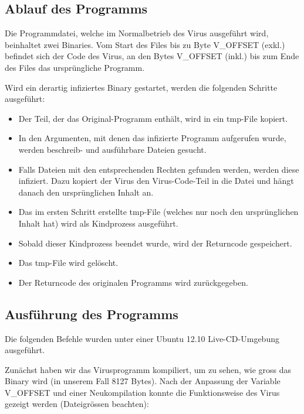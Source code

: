 \documentclass[a4paper,11pt,parskip=half]{scrartcl}
\begin{document}
\subsection{Ablauf des Programms}
Die Programmdatei, welche im \glqq{}Normalbetrieb\grqq{} des Virus ausgeführt wird, beinhaltet zwei Binaries. Vom Start des Files bis zu Byte V\_OFFSET (exkl.) befindet sich der Code des Virus, an den Bytes V\_OFFSET (inkl.) bis zum Ende des Files das ursprüngliche Programm.

Wird ein derartig infiziertes Binary gestartet, werden die folgenden Schritte ausgeführt:
\begin{itemize}
	\item Der Teil, der das Original-Programm enthält, wird in ein tmp-File kopiert.
	\item In den Argumenten, mit denen das infizierte Programm aufgerufen wurde, werden beschreib- und ausführbare Dateien gesucht.
	\item Falls Dateien mit den entsprechenden Rechten gefunden werden, werden diese infiziert. Dazu kopiert der Virus den Virus-Code-Teil in die Datei und hängt danach den ursprünglichen Inhalt an.
	\item Das im ersten Schritt erstellte tmp-File (welches nur noch den ursprünglichen Inhalt hat) wird als Kindprozess ausgeführt.
	\item Sobald dieser Kindprozess beendet wurde, wird der Returncode gespeichert.
	\item Das tmp-File wird gelöscht.
	\item Der Returncode des originalen Programms wird zurückgegeben.
\end{itemize}

\subsection{Ausführung des Programms}
Die folgenden Befehle wurden unter einer Ubuntu 12.10 Live-CD-Umgebung ausgeführt.

Zunächst haben wir das Virusprogramm kompiliert, um zu sehen, wie gross das Binary wird (in unserem Fall 8127 Bytes). Nach der Anpassung der Variable V\_OFFSET und einer Neukompilation konnte die Funktionsweise des Virus gezeigt werden (Dateigrössen beachten):
\end{document}
